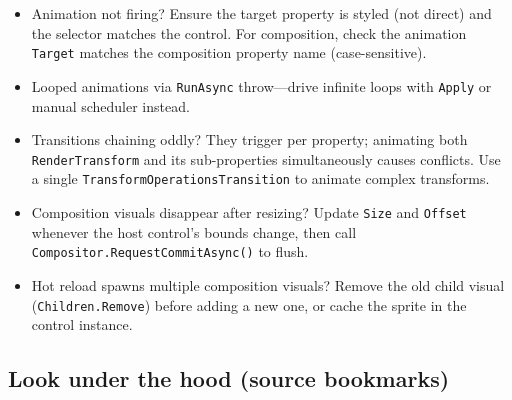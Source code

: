 \begin{itemize}
\tightlist
\item
  Animation not firing? Ensure the target property is styled (not
  direct) and the selector matches the control. For composition, check
  the animation \passthrough{\lstinline!Target!} matches the composition
  property name (case-sensitive).
\item
  Looped animations via \passthrough{\lstinline!RunAsync!} throw---drive
  infinite loops with \passthrough{\lstinline!Apply!} or manual
  scheduler instead.
\item
  Transitions chaining oddly? They trigger per property; animating both
  \passthrough{\lstinline!RenderTransform!} and its sub-properties
  simultaneously causes conflicts. Use a single
  \passthrough{\lstinline!TransformOperationsTransition!} to animate
  complex transforms.
\item
  Composition visuals disappear after resizing? Update
  \passthrough{\lstinline!Size!} and \passthrough{\lstinline!Offset!}
  whenever the host control's bounds change, then call
  \passthrough{\lstinline!Compositor.RequestCommitAsync()!} to flush.
\item
  Hot reload spawns multiple composition visuals? Remove the old child
  visual (\passthrough{\lstinline!Children.Remove!}) before adding a new
  one, or cache the sprite in the control instance.
\end{itemize}

\subsection{Look under the hood (source
bookmarks)}\label{look-under-the-hood-source-bookmarks-26}


